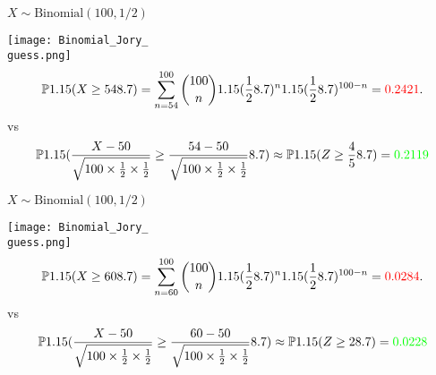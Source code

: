 \begin{frame}[fragile]
\def\guess{54}
\def\ans{0.2421}
  \begin{center}
	$X\sim \text{Binomial}(100,1/2)$
 \bigskip

 \texttt{[image: Binomial\_Jory\_\\guess.png]}
\bigskip
\begin{align*}
  \bbP\left(X\ge \guess\right) = \sum_{n=\guess}^{100} \binom{100}{n} \left(\frac{1}{2}\right)^n \left(\frac{1}{2}\right)^{100-n} = \textcolor{red}{\ans}.
\end{align*}
vs
\begin{align*}
  \bbP\left(\frac{X-50}{\sqrt{100 \times \frac{1}{2}\times \frac{1}{2}}} \ge \frac{\guess-50}{\sqrt{100 \times \frac{1}{2}\times \frac{1}{2}}}\right) \approx
  \bbP\left( Z \ge \frac{4}{5}\right) = \textcolor{green}{0.2119}
\end{align*}
\end{center}
 \end{frame}

\begin{frame}[fragile]
\def\guess{60}
\def\ans{0.0284}
  \begin{center}
	$X\sim \text{Binomial}(100,1/2)$
 \bigskip

 \texttt{[image: Binomial\_Jory\_\\guess.png]}
\bigskip
\begin{align*}
  \bbP\left(X\ge \guess\right) = \sum_{n=\guess}^{100} \binom{100}{n} \left(\frac{1}{2}\right)^n \left(\frac{1}{2}\right)^{100-n} = \textcolor{red}{\ans}.
\end{align*}
vs
\begin{align*}
  \bbP\left(\frac{X-50}{\sqrt{100 \times \frac{1}{2}\times \frac{1}{2}}} \ge \frac{\guess-50}{\sqrt{100 \times \frac{1}{2}\times \frac{1}{2}}}\right) \approx
  \bbP\left( Z \ge 2\right) = \textcolor{green}{0.0228}
\end{align*}
\end{center}
 \end{frame}

